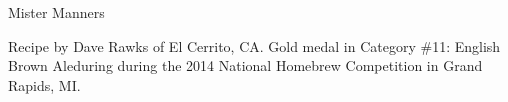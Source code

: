 \begin{recipe}{Mister Manners}

\begin{aboutblock}
Recipe by Dave Rawks of El Cerrito, CA. Gold medal in Category \#11: English Brown
Aleduring during the 2014 National Homebrew Competition in Grand Rapids, MI.
\sourceaha
\end{aboutblock}


\begin{methodandtiming}

\begin{mashsteps}
\end{mashsteps}

\begin{fermentationsteps}
\end{fermentationsteps}

\end{methodandtiming}

\recipebreak

\begin{ingredientsblock}

\begin{malts}
\end{malts}

\begin{hops}
\end{hops}


\end{ingredientsblock}

\end{recipe}

